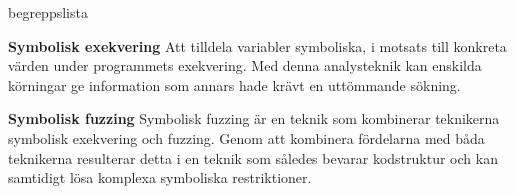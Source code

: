 \begin{labeling}{begreppslista}
  \item [\textbf{Symbolisk exekvering}] Att tilldela variabler symboliska, i
      motsats till konkreta värden under programmets exekvering. Med denna
      analysteknik kan enskilda körningar ge information som annars hade krävt
      en uttömmande sökning.

  \item [\textbf{Symbolisk fuzzing}] Symbolisk fuzzing är en teknik som
    kombinerar teknikerna symbolisk exekvering och fuzzing. Genom att kombinera
    fördelarna med båda teknikerna resulterar detta i en teknik som således
    bevarar kodstruktur och kan samtidigt lösa komplexa symboliska
    restriktioner.  
     
    
\end{labeling}

